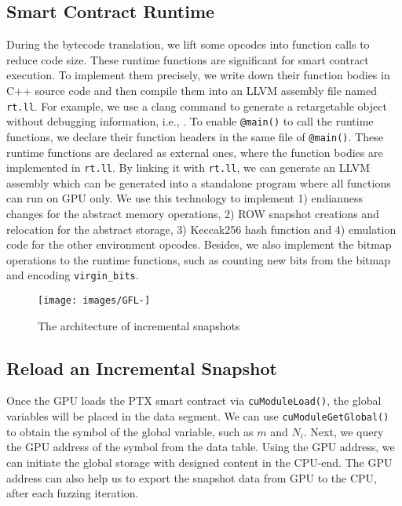 \subsection{Smart Contract Runtime}
During the bytecode translation, we lift some opcodes into function calls to reduce code size. 
These runtime functions are significant for smart contract execution.
%
To implement them precisely, we write down their function bodies in C++ source code and then compile them into an LLVM assembly file named \texttt{rt.ll}. 
%
For example, we use a clang command to generate a retargetable object without debugging information, i.e., .
%
To enable \texttt{@main()} to call the runtime functions, we declare their function headers in the same file of \texttt{@main()}.
These runtime functions are declared as external ones, where the function bodies are implemented in \texttt{rt.ll}. 
%
By linking it with \texttt{rt.ll}, we can generate an LLVM assembly which can be generated into a standalone program where all functions can run on GPU only.
%
We use this technology to implement 1) endianness changes for the abstract memory operations, 2) ROW snapshot creations and relocation for the abstract storage, 3) Keccak256 hash function and 4) emulation code for the other environment opcodes. 
%
Besides, we also implement the bitmap operations to the runtime functions, such as counting new bits from the bitmap and encoding \texttt{virgin\_bits}.

\begin{figure*}[!ht]
\centerline{\texttt{[image: images/GFL-]}}
\caption{The architecture of incremental snapshots}
\vspace{-0.1in}
\label{fig:snapshot}
\end{figure*}

\subsection{Reload an Incremental Snapshot}
Once the GPU loads the PTX smart contract via \texttt{cuModuleLoad()}, the global variables will be placed in the data segment. 
We can use \texttt{cuModuleGetGlobal()} to obtain the symbol of the global variable, such as $m$ and $N_i$. 
Next, we query the GPU address of the symbol from  the data table. 
%
Using the GPU address, we can initiate the global storage with designed content in the CPU-end.
%
The GPU address can also help us to export the snapshot data from GPU to the CPU, after each fuzzing iteration.



